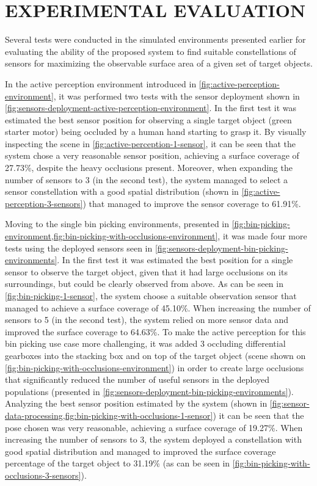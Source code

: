 \section{\uppercase{Experimental evaluation}}\label{sec:results}

\noindent Several tests were conducted in the simulated environments presented earlier for evaluating the ability of the proposed system to find suitable constellations of sensors for maximizing the observable surface area of a given set of target objects.

In the active perception environment introduced in \cref{fig:active-perception-environment}, it was performed two tests with the sensor deployment shown in \cref{fig:sensors-deployment-active-perception-environment}. In the first test it was estimated the best sensor position for observing a single target object (green starter motor) being occluded by a human hand starting to grasp it. By visually inspecting the scene in \cref{fig:active-perception-1-sensor}, it can be seen that the system chose a very reasonable sensor position, achieving a surface coverage of 27.73\%, despite the heavy occlusions present. Moreover, when expanding the number of sensors to 3 (in the second test), the system managed to select a sensor constellation with a good spatial distribution (shown in \cref{fig:active-perception-3-sensors}) that managed to improve the sensor coverage to 61.91\%.

Moving to the single bin picking environments, presented in \cref{fig:bin-picking-environment,fig:bin-picking-with-occlusions-environment}, it was made four more tests using the deployed sensors seen in \cref{fig:sensors-deployment-bin-picking-environments}. In the first test it was estimated the best position for a single sensor to observe the target object, given that it had large occlusions on its surroundings, but could be clearly observed from above. As can be seen in \cref{fig:bin-picking-1-sensor}, the system choose a suitable observation sensor that managed to achieve a surface coverage of 45.10\%. When increasing the number of sensors to 5 (in the second test), the system relied on more sensor data and improved the surface coverage to 64.63\%. To make the active perception for this bin picking use case more challenging, it was added 3 occluding differential gearboxes into the stacking box and on top of the target object (scene shown on \cref{fig:bin-picking-with-occlusions-environment}) in order to create large occlusions that significantly reduced the number of useful sensors in the deployed populations (presented in \cref{fig:sensors-deployment-bin-picking-environments}). Analyzing the best sensor position estimated by the system (shown in \cref{fig:sensor-data-processing,fig:bin-picking-with-occlusions-1-sensor}) it can be seen that the pose chosen was very reasonable, achieving a surface coverage of 19.27\%. When increasing the number of sensors to 3, the system deployed a constellation with good spatial distribution and managed to improved the surface coverage percentage of the target object to 31.19\% (as can be seen in \cref{fig:bin-picking-with-occlusions-3-sensors}).

